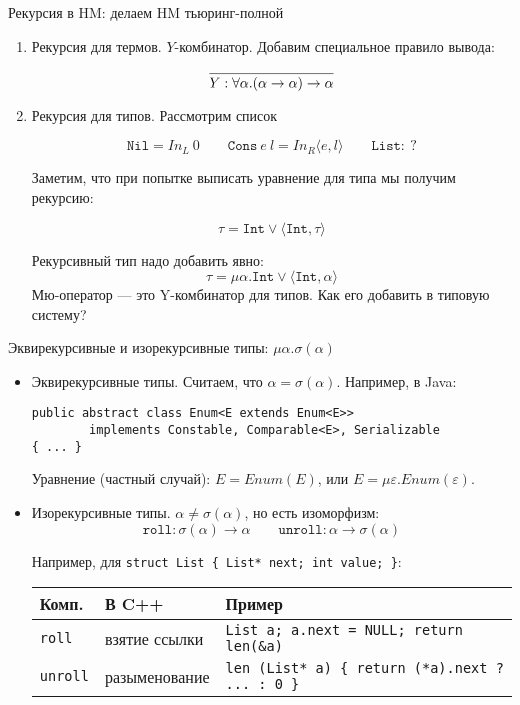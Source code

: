 \documentclass[aspectratio=169]{beamer}
\begin{document}
\begin{frame}{Рекурсия в HM: делаем HM тьюринг-полной}

\begin{enumerate}
\item Рекурсия для термов. $Y$-комбинатор. Добавим специальное правило вывода:

$$\infer{Y : \forall \alpha.(\alpha\rightarrow\alpha)\rightarrow\alpha}{}$$

\item Рекурсия для типов. Рассмотрим список

\vspace{-0.2cm}
$$\texttt{Nil} = In_L\ 0\qquad \texttt{Cons}\ e\ l = In_R \langle e,l \rangle\qquad \texttt{List} :\ ?$$

Заметим, что при попытке выписать уравнение для типа мы получим рекурсию:

\vspace{-0.5cm}
$$\tau = \texttt{Int} \vee \langle \texttt{Int}, \tau \rangle$$

Рекурсивный тип надо добавить явно: $$\tau = \mu \alpha.\texttt{Int}\vee\langle\texttt{Int},\alpha\rangle$$
Мю-оператор --- это Y-комбинатор для типов. Как его добавить в типовую систему?

\end{enumerate}
\end{frame}

\begin{frame}[fragile]{Эквирекурсивные и изорекурсивные типы: $\mu\alpha.\sigma(\alpha)$}
\begin{itemize}
\item Эквирекурсивные типы. Считаем, что $\alpha = \sigma(\alpha)$.
Например, в Java:
\begin{verbatim}
public abstract class Enum<E extends Enum<E>>
        implements Constable, Comparable<E>, Serializable 
{ ... }
\end{verbatim}

Уравнение (частный случай): $E = Enum(E)$, или $E = \mu \varepsilon . Enum(\varepsilon)$.

\item Изорекурсивные типы. $\alpha \ne \sigma(\alpha)$, но есть изоморфизм:
 $$\texttt{roll}: \sigma(\alpha)\rightarrow\alpha\quad\quad\texttt{unroll}: \alpha\rightarrow\sigma(\alpha)$$

Например, для \verb!struct List { List* next; int value; }!:

\begin{center}\begin{tabular}{lll}
Комп. & В C++ & Пример \\\hline
\verb!roll! & взятие ссылки & \small\verb!List a; a.next = NULL; return len(!\color{blue}\verb!&a!\color{black}\verb!)!\\
\verb!unroll! & разыменование & \small\verb!len (List* a) { return (!\color{blue}\verb!*a!\color{black}\verb!).next ? ... : 0 }!
\end{tabular}\end{center}

\end{itemize}
\end{frame}
\end{document}
